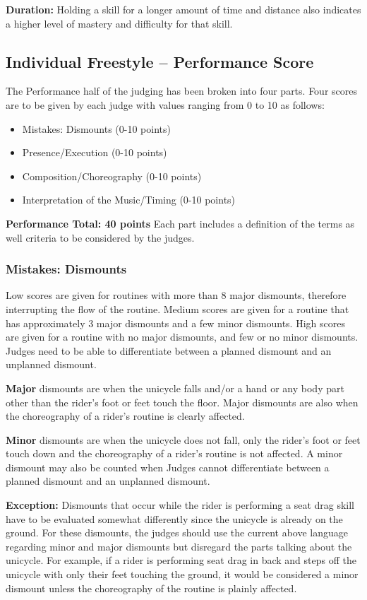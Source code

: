 \textbf{Duration:} Holding a skill for a longer amount of time and distance also indicates a higher level of mastery and difficulty for that skill.

\subsection{Individual Freestyle -- Performance Score \label{sec:freestyle_individual-performance-score}}
The Performance half of the judging has been broken into four parts.
Four scores are to be given by each judge with values ranging from 0 to 10 as follows:
\begin{itemize}
\item Mistakes: Dismounts (0-10 points) 
\item Presence/Execution (0-10 points)
\item Composition/Choreography (0-10 points)
\item Interpretation of the Music/Timing (0-10 points)
\end{itemize}
\textbf{Performance Total: 40 points}
Each part includes a definition of the terms as well criteria to be considered by the judges.

\subsubsection{Mistakes: Dismounts}
Low scores are given for routines with more than 8 major dismounts, therefore interrupting the flow of the routine.
Medium scores are given for a routine that has approximately 3 major dismounts and a few minor dismounts.
High scores are given for a routine with no major dismounts, and few or no minor dismounts.
Judges need to be able to differentiate between a planned dismount and an unplanned dismount.

\textbf{Major} dismounts are when the unicycle falls and/or a hand or any body part other than the rider's foot or feet touch the floor.
Major dismounts are also when the choreography of a rider's routine is clearly affected.

\textbf{Minor} dismounts are when the unicycle does not fall, only the rider's foot or feet touch down and the choreography of a rider's routine is not affected.
A minor dismount may also be counted when Judges cannot differentiate between a planned dismount and an unplanned dismount.

\textbf{Exception:}
Dismounts that occur while the rider is performing a seat drag skill have to be evaluated somewhat differently since the unicycle is already on the ground.
For these dismounts, the judges should use the current above language regarding minor and major dismounts but disregard the parts talking about the unicycle.
For example, if a rider is performing seat drag in back and steps off the unicycle with only their feet touching the ground, it would be considered a minor dismount unless the choreography of the routine is plainly affected.

